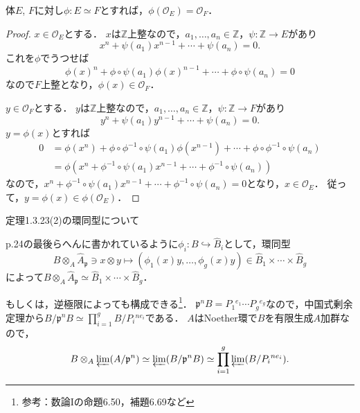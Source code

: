 \begin{screen}
  \begin{lem}
    \label{iso_field_integral_closure}
    体$E$, $F$に対し$\phi \colon E \simeq F$とすれば，$\phi(\mathcal{O}_E) = \mathcal{O}_F$．
  \end{lem}
\end{screen}
\begin{proof}
  $x\in \mathcal{O}_E$とする．
  $x$は$\mathbb{Z}$上整なので，$a_1, \ldots, a_n \in \mathbb{Z}$，$\psi\colon\mathbb{Z}\to E$があり
  \[x^n + \psi(a_1)x^{n-1} + \cdots + \psi(a_n) = 0.\]
  これを$\phi$でうつせば
  \[\phi(x)^n + \phi\circ\psi(a_1)\phi(x)^{n-1} + \cdots + \phi\circ\psi(a_n) = 0\]
  なので$F$上整となり，$\phi(x) \in \mathcal{O}_F$．

  $y \in \mathcal{O}_F$とする．
  $y$は$\mathbb{Z}$上整なので，$a_1, \ldots, a_n \in \mathbb{Z}$，$\psi\colon\mathbb{Z}\to F$があり
  \[y^n + \psi(a_1)y^{n-1} + \cdots + \psi(a_n) = 0.\]
  $y = \phi(x)$とすれば
  \begin{align*}
    0 &= \phi(x^n) + \phi\circ\phi^{-1}\circ\psi(a_1) \phi(x^{n-1}) + \cdots + \phi\circ\phi^{-1}\circ\psi(a_n) \\
      &= \phi \left( x^n + \phi^{-1}\circ\psi(a_1) x^{n-1} + \cdots + \phi^{-1}\circ\psi(a_n) \right)
  \end{align*}
  なので，$x^n + \phi^{-1}\circ\psi(a_1) x^{n-1} + \cdots + \phi^{-1}\circ\psi(a_n) = 0$となり，$x \in \mathcal{O}_E$．
  従って，$y = \phi(x) \in \phi(\mathcal{O}_E)$．
\end{proof}

\begin{screen}
  \begin{thm}
    \label{Thm_1_3_23_2}
    定理1.3.23(2)の環同型について
  \end{thm}
\end{screen}
p.24の最後らへんに書かれているように$\phi_i\colon B\hookrightarrow\widehat{B}_i$として，環同型
\[B\otimes_A\widehat{A}_\mathfrak{p}\ni x \otimes y\mapsto(\phi_1(x)y, \ldots, \phi_g(x)y)\in\widehat{B}_1\times\cdots\times\widehat{B}_g\]
によって$B\otimes_A\widehat{A}_\mathfrak{p}\simeq\widehat{B}_1\times\cdots\times\widehat{B}_g$．

もしくは，逆極限によっても構成できる\footnote{参考：数論Iの命題6.50，補題6.69など}．
$\mathfrak{p}^nB = P_1{}^{e_1} \cdots P_g{}^{e_g}$なので，中国式剰余定理から$B/\mathfrak{p}^nB \simeq \prod_{i = 1}^g B/P_i{}^{ne_i}$である．
$A$はNoether環で$B$を有限生成$A$加群なので，
\[ B \otimes_A \varprojlim (A/\mathfrak{p}^n) \simeq \varprojlim(B/\mathfrak{p}^nB) \simeq \prod_{i = 1}^g \varprojlim (B/P_i{}^{ne_i}). \]

